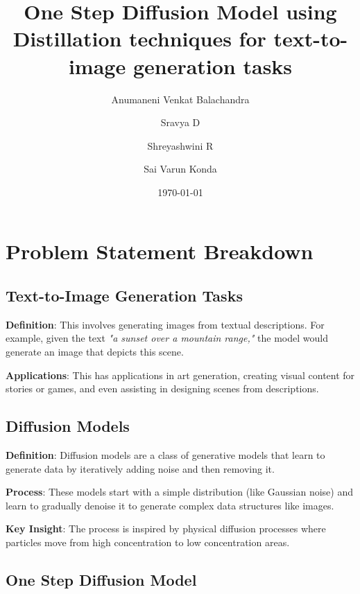 \documentclass[11pt]{article}
\title{One Step Diffusion Model using Distillation techniques for text-to-image generation tasks}
\author{ Anumaneni Venkat Balachandra 
        \and Sravya D
        \and Shreyashwini R
        \and Sai Varun Konda}
\date{\today} %
\begin{document}

\maketitle
\thispagestyle{empty}

\tableofcontents

\newpage





\section{Problem Statement Breakdown}

\subsection{Text-to-Image Generation Tasks}

\textbf{Definition}: This involves generating images from textual descriptions. For example, given the text \textit{"a sunset over a mountain range,"} the model would generate an image that depicts this scene.

\textbf{Applications}: This has applications in art generation, creating visual content for stories or games, and even assisting in designing scenes from descriptions.

\subsection{Diffusion Models}

\textbf{Definition}: Diffusion models are a class of generative models that learn to generate data by iteratively adding noise and then removing it.

\textbf{Process}: These models start with a simple distribution (like Gaussian noise) and learn to gradually denoise it to generate complex data structures like images.

\textbf{Key Insight}: The process is inspired by physical diffusion processes where particles move from high concentration to low concentration areas.

\subsection{One Step Diffusion Model}
\end{document}
